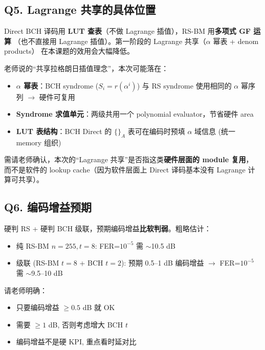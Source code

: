 \documentclass[11pt,a4paper]{article}
\begin{document}
\subsection{Q5. Lagrange 共享的具体位置}

\begin{riskbox}[title=\textbf{Q5. Direct + BM 共享什么？}]
Direct BCH 译码用 \textbf{LUT 查表}（不做 Lagrange 插值），RS-BM 用\textbf{多项式 GF 运算}
（也不直接用 Lagrange 插值）。第一阶段的 Lagrange 共享（$\alpha$ 幂表 + denom products）
在本课题的效用会大幅降低。

老师说的``共享拉格朗日插值理念''，本次可能落在：

\begin{itemize}[leftmargin=1em, itemsep=1pt]
\item \textbf{$\alpha$ 幂表}：BCH syndrome ($S_i = r(\alpha^i)$) 与 RS syndrome 使用相同的 $\alpha$ 幂序列 $\to$ 硬件可复用
\item \textbf{Syndrome 求值单元}：两级共用一个 polynomial evaluator，节省硬件 area
\item \textbf{LUT 表结构}：BCH Direct 的 $\{\}_A$ 表可在编码时预填 $\alpha$ 域信息 (统一 memory 组织)
\end{itemize}

需请老师确认，本次的``Lagrange 共享''是否指这类\textbf{硬件层面的 module 复用}，
而不是软件的 lookup cache（因为软件层面上 Direct 译码基本没有 Lagrange 计算可共享）。
\end{riskbox}

\subsection{Q6. 编码增益预期}

\begin{riskbox}[title=\textbf{Q6. 硬判决级联的编码增益是否达标？}]
硬判 RS + 硬判 BCH 级联，预期编码增益\textbf{比软判弱}。粗略估计：

\begin{itemize}[leftmargin=1em, itemsep=1pt]
\item 纯 RS-BM $n=255, t=8$: FER=$10^{-5}$ 需 $\sim$10.5 dB
\item 级联 (RS-BM $t=8$ + BCH $t=2$): 预期 0.5--1 dB 编码增益 $\to$ FER=$10^{-5}$ 需 $\sim$9.5--10 dB
\end{itemize}

请老师明确：
\begin{itemize}[leftmargin=1em, itemsep=1pt]
\item [(a)] 只要编码增益 $\ge 0.5$ dB 就 OK
\item [(b)] 需要 $\ge 1$ dB, 否则考虑增大 BCH $t$
\item [(c)] 编码增益不是硬 KPI, 重点看时延对比
\end{itemize}
\end{riskbox}
\end{document}
